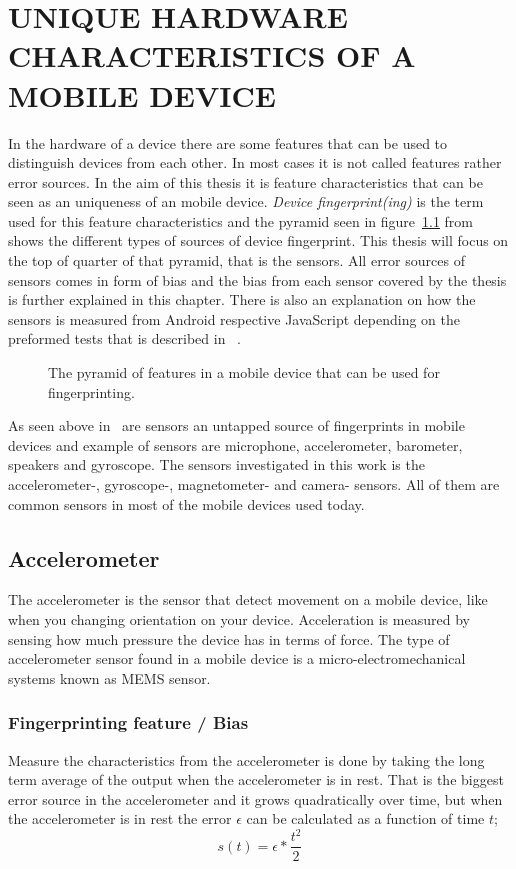\chapter{UNIQUE HARDWARE CHARACTERISTICS OF A MOBILE DEVICE}\label{cha:character}
In the hardware of a device there are some features that can be used to distinguish devices from each other. In most cases it is not called features rather error sources. In the aim of this thesis it is feature characteristics that can be seen as an uniqueness of an mobile device. \textit{Device fingerprint(ing)} is the term used for this feature characteristics and the pyramid seen in figure~\ref{fig:pyramid} from ~\cite[]{sensor:acoustic} shows the different types of sources of device fingerprint. This thesis will focus on the top of quarter of that pyramid, that is the sensors. All error sources of sensors comes in form of bias and the bias from each sensor covered by the thesis is further explained in this chapter. There is also an explanation on how the sensors is measured from Android respective JavaScript depending on the preformed tests that is described in ~.

\begin{figure}[!h]
	
	\caption{\label{fig:pyramid} The pyramid of features in a mobile device that can be used for fingerprinting.\cite[]{sensor:acoustic}}
\end{figure}

As seen above in~ are sensors an untapped source of fingerprints in mobile devices and example of sensors are microphone, accelerometer, barometer, speakers and gyroscope. The sensors investigated in this work is the accelerometer-, gyroscope-, magnetometer- and camera- sensors. All of them are common sensors in most of the mobile devices used today.


\section{Accelerometer}\label{sec:accelerometer}
The accelerometer is the sensor that detect movement on a mobile device, like when you changing orientation on your device. Acceleration is measured by sensing how much pressure the device has in terms of force. The type of accelerometer sensor found in a mobile device is a micro-electromechanical systems known as MEMS sensor. \cite[]{sensors:fusion}
\subsection{Fingerprinting feature / Bias}
Measure the characteristics from the accelerometer is done by taking the long term average of the output when the accelerometer is in rest. That is the biggest error source in the accelerometer and it grows quadratically over time, but when the accelerometer is in rest the error $\epsilon$ can be calculated as a function of time $t$;
$$s(t)=\epsilon * \frac{t^2}{2} $$
\cite[]{sensor:inertialNav}\cite[]{sensors:fusion}


